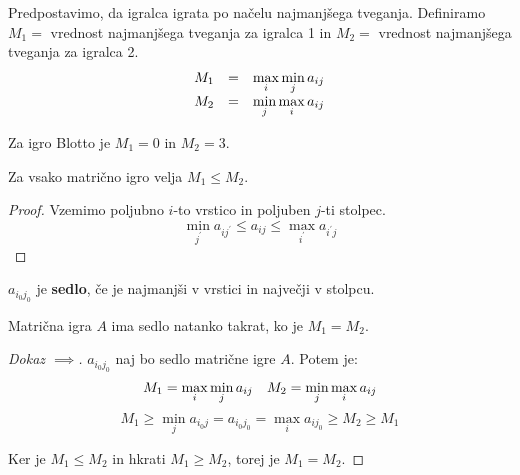 \documentclass[11pt, a4paper]{article}
\begin{document}
    Predpostavimo, da igralca igrata po načelu najmanjšega tveganja. Definiramo \(M_1 =\) vrednost najmanjšega tveganja za igralca 1 in \(M_2 =\) vrednost najmanjšega tveganja za igralca 2. 
    \[
        \begin{array}{*3{>{\displaystyle}l}}
            M_1 & = & \max_i \min_j a_{ij} \\
            M_2 & = & \min_j \max_i a_{ij}
        \end{array}  
    \]

    Za igro Blotto je \(M_1=0\) in \(M_2=3\).
    
    \begin{proposition}
        Za vsako matrično igro velja \(M_1 \le M_2\).
    \end{proposition}

    \begin{proof}
        Vzemimo poljubno \(i\)-to vrstico in poljuben \(j\)-ti stolpec.
        \[
            \min_{j^\prime} a_{ij^\prime} \le a_{ij} \le \max_{i^\prime} a_{i^\prime j}    
        \]
    \end{proof}

    \begin{definition}
        \(a_{i_0 j_0}\) je \textbf{sedlo}, če je najmanjši v vrstici in največji v stolpcu.
    \end{definition}

    \begin{proposition}
        Matrična igra \(A\) ima sedlo natanko takrat, ko je \(M_1 = M_2\).
    \end{proposition}

    \begin{proof}[Dokaz \(\implies\)]
        \(a_{i_0 j_0}\) naj bo sedlo matrične igre \(A\). Potem je:
        \[
            \begin{array}{*2{>{\displaystyle}c}}
                M_1 = \max_i \min_j a_{ij} & M_2 = \min_j \max_i a_{ij}
            \end{array}
        \]
        \[
            M_1 \ge \min_j a_{i_0 j} = a_{i_0 j_0} = \max_i a_{i j_0} \ge M_2 \ge M_1
        \]

        Ker je \(M_1 \le M_2\) in hkrati \(M_1 \ge M_2\), torej je \(M_1 = M_2\).
    \end{proof}
\end{document}
